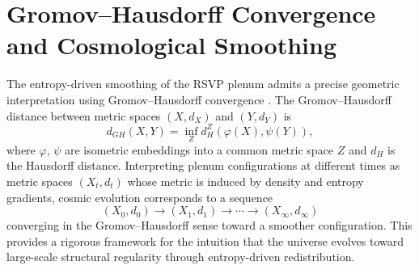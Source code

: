 \documentclass[12pt,a4paper]{article}
\theoremstyle{plain}
\theoremstyle{definition}
\theoremstyle{remark}
\begin{document}
\section{Gromov--Hausdorff Convergence and Cosmological Smoothing}

The entropy-driven smoothing of the RSVP plenum admits a precise
geometric interpretation using Gromov--Hausdorff convergence
\cite{Gromov1999,Villani}. The Gromov--Hausdorff distance between
metric spaces $(X,d_X)$ and $(Y,d_Y)$ is
\begin{equation}
d_{GH}(X,Y) = \inf_Z d_H^Z(\varphi(X),\psi(Y)),
\end{equation}
where $\varphi$, $\psi$ are isometric embeddings into a common metric
space $Z$ and $d_H$ is the Hausdorff distance. Interpreting plenum
configurations at different times as metric spaces $(X_t,d_t)$ whose
metric is induced by density and entropy gradients, cosmic evolution
corresponds to a sequence
\begin{equation}
(X_0,d_0) \rightarrow (X_1,d_1) \rightarrow \cdots \rightarrow (X_\infty, d_\infty)
\end{equation}
converging in the Gromov--Hausdorff sense toward a smoother
configuration. This provides a rigorous framework for the intuition
that the universe evolves toward large-scale structural regularity
through entropy-driven redistribution.
\end{document}
